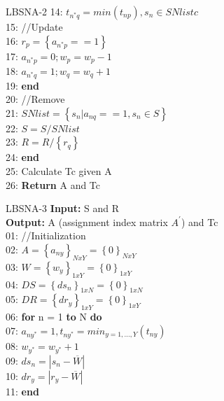 \documentclass[main.tex]{subfiles}
\begin{document}
\begin{frame}{LBSNA-2}
14: \hspace{4mm}$t_{n^*q} = min(t_{np}), s_n \in SNlistc$\\
15: \hspace{4mm}//Update\\
16: \hspace{4mm}$r_p = \left\{a_{n^*p} == 1\right\}$\\
17: \hspace{4mm}$a_{n^*p} = 0; w_p = w_p - 1$\\
18: \hspace{4mm}$a_{n^*q} = 1; w_{q} = w_{q} + 1$\\
19: \hspace{2mm}\textbf{end}\\
20: \hspace{2mm}//Remove\\
21: \hspace{2mm}$SNlist = \left\{s_n | a_{nq} == 1, s_n \in S\right\}$\\
22: \hspace{2mm}$S = S/SNlist$\\
23: \hspace{2mm}$R = R/\left\{r_q\right\}$\\
24: \textbf{end}\\
25: Calculate Tc given A\\
26: \textbf{Return} A and Tc\\
\end{frame}

\begin{frame}{LBSNA-3}
\footnotesize
\textbf{Input:} S and R\\
\textbf{Output:} A (assignment index matrix $A^{'}$) and Tc\\
01: //Initialization\\
02: $A = \left\{a_{ny}\right\}_{NxY} = \left\{0\right\}_{NxY}$\\
03: $W = \left\{w_{y}\right\}_{1xY} = \left\{0\right\}_{1xY}$\\
04: $DS = \left\{ds_{n}\right\}_{1xN} = \left\{0\right\}_{1xN}$\\
05: $DR = \left\{dr_{y}\right\}_{1xY} = \left\{0\right\}_{1xY}$\\
06: \textbf{for} n = 1 \textbf{to} N \textbf{do}\\
07: \hspace{2mm}$a_{ny^*} = 1, t_{ny^*} = min_{y=1,...,Y}(t_{ny})$\\
08: \hspace{2mm}$w_{y^*} = w_{y^*} + 1$\\
09: \hspace{2mm}$ds_n = |s_n - \overline{W}|$\\
10: \hspace{2mm}$dr_y = |r_y - \overline{W}|$\\
11: \textbf{end}\\
\end{frame}
\end{document}
